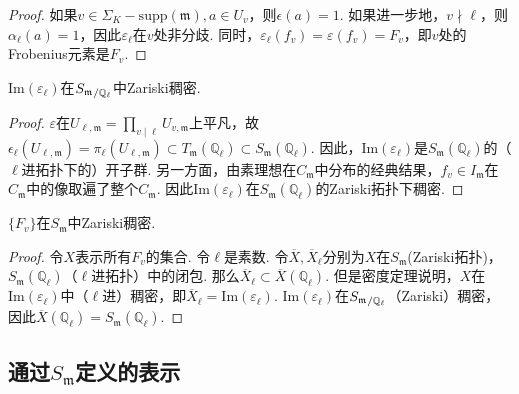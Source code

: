 \begin{proof}
    如果$v\in \Sigma_K - \mathrm{supp}(\mathfrak{m}), a\in U_v$，则$\epsilon(a) = 1$. 如果进一步地，$v\nmid \ell$，则$\alpha_{\ell}(a) = 1$，因此$\varepsilon_{\ell}$在$v$处非分歧. 同时，$\varepsilon_{\ell}(f_v)=\varepsilon(f_v) = F_v$，即$v$处的Frobenius元素是$F_v$.
\end{proof}

\begin{cthm}
    $\mathrm{Im}(\varepsilon_{\ell})$在${S_{\mathfrak{m}}}_{/\mathbb{Q}_{\ell}}$中Zariski稠密.
\end{cthm}

\begin{proof}
    $\varepsilon$在$U_{\ell, \mathfrak{m}} = \prod_{v\mid \ell} U_{v, \mathfrak{m}}$上平凡，故$\epsilon_{\ell}(U_{\ell, \mathfrak{m}}) = \pi_{\ell}(U_{\ell, \mathfrak{m}})\subset T_{\mathfrak{m}}(\mathbb{Q}_{\ell}) \subset S_{\mathfrak{m}}(\mathbb{Q}_{\ell})$. 因此，$\mathrm{Im}(\varepsilon_{\ell})$是$S_{\mathfrak{m}}(\mathbb{Q}_{\ell})$的（$\ell$进拓扑下的）开子群. 另一方面，由素理想在$C_{\mathfrak{m}}$中分布的经典结果，$f_v\in I_{\mathfrak{m}}$在$C_{\mathfrak{m}}$中的像取遍了整个$C_{\mathfrak{m}}$.
    因此$\mathrm{Im}(\varepsilon_{\ell})$在$S_{\mathfrak{m}}(\mathbb{Q}_{\ell})$的Zariski拓扑下稠密.
\end{proof}

\begin{ccor}
    $\{F_v\}$在$S_{\mathfrak{m}}$中Zariski稠密. \label{frob_dense}
\end{ccor}

\begin{proof}
    令$X$表示所有$F_v$的集合. 令$\ell$是素数. 令$\overline{X}, \overline{X}_{\ell}$分别为$X$在$S_{\mathfrak{m}}$(Zariski拓扑)，$S_{\mathfrak{m}}(\mathbb{Q}_{\ell})$（$\ell$进拓扑）中的闭包. 那么$\overline{X}_{\ell}\subset \overline{X}(\mathbb{Q}_{\ell})$. 但是\Chebotarev 密度定理说明，$X$在$\mathrm{Im}(\varepsilon_{\ell})$中（$\ell$进）稠密，即$\overline{X}_{\ell} = \mathrm{Im}(\varepsilon_{\ell})$. $\mathrm{Im}(\varepsilon_{\ell})$在${S_{\mathfrak{m}}}_{/\mathbb{Q}_{\ell}}$（Zariski）稠密，因此$\overline{X}(\mathbb{Q}_{\ell}) = S_{\mathfrak{m}}(\mathbb{Q}_{\ell})$.
\end{proof}

\subsection{通过\texorpdfstring{$S_{\mathfrak{m}}$}{Sm}定义的表示}

